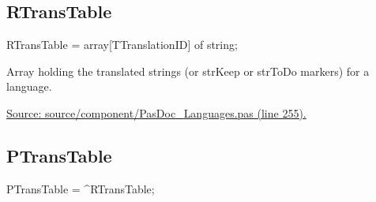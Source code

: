 \documentclass{report}
\newif\ifpdf
\begin{document}
\subsection*{RTransTable}
\fi
\label{PasDoc_Languages-RTransTable}
\begin{list}{}{
\setlength{\itemindent}{0cm}
\setlength{\listparindent}{0cm}
\setlength{\leftmargin}{\evensidemargin}
\addtolength{\leftmargin}{\tmplength}
\settowidth{\labelsep}{X}
\addtolength{\leftmargin}{\labelsep}
\setlength{\labelwidth}{\tmplength}
}
\item[\textbf{Declaration}\hfill]
\ifpdf
\begin{flushleft}
\fi
\begin{ttfamily}
RTransTable = array[TTranslationID] of string;\end{ttfamily}

\ifpdf
\end{flushleft}
\fi

\par
\item[\textbf{Description}]
Array holding the translated strings (or strKeep or strToDo markers) for a language.\par
\href{https://github.com/pasdoc/pasdoc/blob/master/source/component/PasDoc_Languages.pas#L255}{Source: source/component/PasDoc{\_}Languages.pas (line 255).}

\end{list}
\ifpdf
\subsection*{\large{\textbf{PTransTable}}\normalsize\hspace{1ex}\hrulefill}
\else
\subsection*{PTransTable}
\fi
\label{PasDoc_Languages-PTransTable}
\begin{list}{}{
\setlength{\itemindent}{0cm}
\setlength{\listparindent}{0cm}
\setlength{\leftmargin}{\evensidemargin}
\addtolength{\leftmargin}{\tmplength}
\settowidth{\labelsep}{X}
\addtolength{\leftmargin}{\labelsep}
\setlength{\labelwidth}{\tmplength}
}
\item[\textbf{Declaration}\hfill]
\ifpdf
\begin{flushleft}
\fi
\begin{ttfamily}
PTransTable = {\^{}}RTransTable;\end{ttfamily}

\ifpdf
\end{flushleft}
\fi

\end{list}
\ifpdf
\end{document}
